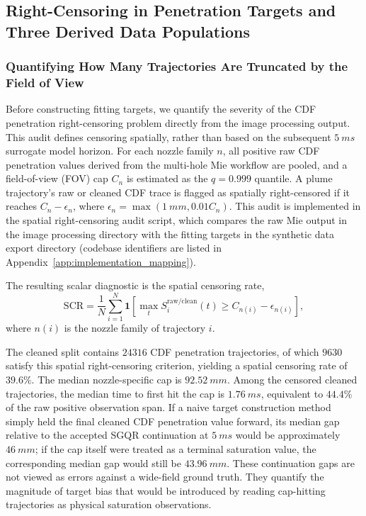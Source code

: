 \subsection{Right-Censoring in Penetration Targets and Three Derived Data Populations}
\label{sec:cdf-populations-en}

\subsubsection{Quantifying How Many Trajectories Are Truncated by the Field of View}
\label{sec:cdf-spatial-censoring-audit}
\newcommand{\scrNTotal}{24316}%
\newcommand{\scrNCensored}{9630}%
\newcommand{\scrRatePct}{39.6}%
\newcommand{\scrNaiveHoldGapMedianMm}{46}%

Before constructing fitting targets, we quantify the severity of the CDF penetration right-censoring problem directly from the image processing output. This audit defines censoring spatially, rather than based on the subsequent \(\SI{5}{ms}\) surrogate model horizon. For each nozzle family \(n\), all positive raw CDF penetration values derived from the multi-hole Mie workflow are pooled, and a field-of-view (FOV) cap \(C_n\) is estimated as the \(q=0.999\) quantile. A plume trajectory's raw or cleaned CDF trace is flagged as spatially right-censored if it reaches \(C_n-\epsilon_n\), where \(\epsilon_n=\max(\SI{1}{mm},0.01C_n)\). This audit is implemented in the spatial right-censoring audit script, which compares the raw Mie output in the image processing directory with the fitting targets in the synthetic data export directory (codebase identifiers are listed in Appendix~\ref{app:implementation_mapping}).

The resulting scalar diagnostic is the spatial censoring rate,
\[
\mathrm{SCR}
=
\frac{1}{N}\sum_{i=1}^{N}
\mathbf{1}\!\left[
\max_t S_i^{\mathrm{raw/clean}}(t)
\ge C_{n(i)}-\epsilon_{n(i)}
\right],
\]
where \(n(i)\) is the nozzle family of trajectory \(i\).

The cleaned split contains \(\num{\scrNTotal}\) CDF penetration trajectories, of which \(\num{\scrNCensored}\) satisfy this spatial right-censoring criterion, yielding a spatial censoring rate of \(\scrRatePct\%\). The median nozzle-specific cap is \(\SI{92.52}{mm}\). Among the censored cleaned trajectories, the median time to first hit the cap is \(\SI{1.76}{ms}\), equivalent to \(44.4\%\) of the raw positive observation span. If a naive target construction method simply held the final cleaned CDF penetration value forward, its median gap relative to the accepted SGQR continuation at \(\SI{5}{ms}\) would be approximately \(\SI{\scrNaiveHoldGapMedianMm}{mm}\); if the cap itself were treated as a terminal saturation value, the corresponding median gap would still be \(\SI{43.96}{mm}\). These continuation gaps are not viewed as errors against a wide-field ground truth. They quantify the magnitude of target bias that would be introduced by reading cap-hitting trajectories as physical saturation observations.


